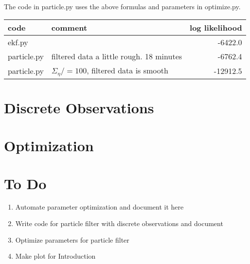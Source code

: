 \documentclass[12pt]{article}
\begin{document}
The code in particle.py uses the above formulas and parameters in
optimize.py.

\begin{tabular}[t]{l|l|r}
  code&comment&log likelihood \\ \hline
  ekf.py & & -6422.0 \\
  particle.py & filtered data a little rough. 18 minutes &
                                                               -6762.4 \\
  particle.py & $\Sigma_\eta /= 100$, filtered data is smooth &
                                                               -12912.5 \\
\end{tabular}

\section{Discrete Observations}
\label{sec:DiscreteObservations}

\section{Optimization}
\label{sec:Optimization}

\section{To Do}
\label{sec:ToDo}

\begin{enumerate}
\item Automate parameter optimization and document it here
\item Write code for particle filter with discrete observations and document
\item Optimize parameters for particle filter
\item Make plot for Introduction
\end{enumerate}
\end{document}
